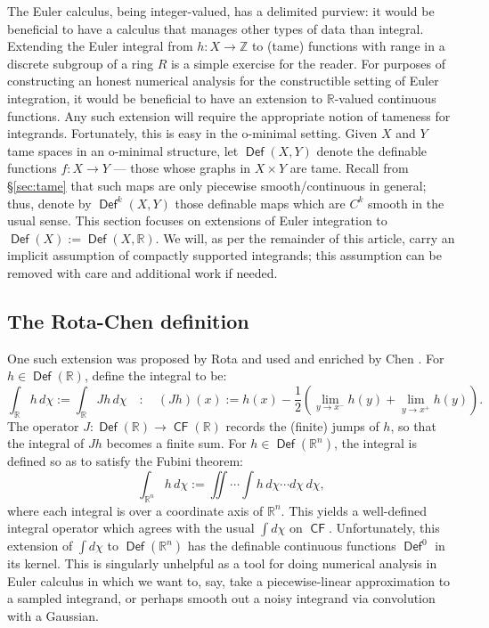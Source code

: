 \documentclass{psapm-l}
\theoremstyle{definition}
\theoremstyle{remark}
\numberwithin{equation}{section}
\begin{document}
The Euler calculus, being integer-valued, has a delimited purview: it would be beneficial to have a calculus that manages other types of data than integral. Extending the Euler integral from $h\colon X\to{{\mathbb Z}}$ to (tame) functions with range in a discrete subgroup of a ring $R$ is a simple exercise for the reader. For purposes of constructing an honest numerical analysis for the constructible setting of Euler integration, it would be beneficial to have an extension to ${{\mathbb R}}$-valued continuous functions. Any such extension will require the appropriate notion of tameness for integrands. Fortunately, this is easy in the o-minimal setting. Given $X$ and $Y$ tame spaces in an o-minimal structure, let ${{{\operatorname{\mathsf{{Def}}}}}}(X,Y)$ denote the definable functions $f\colon X\to Y$ --- those whose graphs in $X\times Y$ are tame. Recall from \S\ref{sec:tame} that such maps are only piecewise smooth/continuous in general; thus, denote by ${{{\operatorname{\mathsf{{Def}}}}}}^k(X,Y)$ those definable maps which are $C^k$ smooth in the usual sense. This section focuses on extensions of Euler integration to ${{{\operatorname{\mathsf{{Def}}}}}}(X):={{{\operatorname{\mathsf{{Def}}}}}}(X,{{\mathbb R}})$. We will, as per the remainder of this article, carry an implicit assumption of compactly supported integrands; this assumption can be removed with care and additional work if needed.

\subsection{The Rota-Chen definition}
\label{sec:RC}

One such extension was proposed by Rota \cite{Rota} and used and enriched by Chen \cite{Chen}. For $h\in{{{\operatorname{\mathsf{{Def}}}}}}({{\mathbb R}})$, define the integral to be:
\begin{equation}
    \int_{{\mathbb R}} h\,d\chi := \int_{{\mathbb R}} J h\,d\chi
    \quad : \quad
    (J h)(x) := h(x)-\frac{1}{2}\left(\lim_{y\to x^-}h(y)+\lim_{y\to x^+}h(y)\right) .
\end{equation}
The operator $J\colon{{{\operatorname{\mathsf{{Def}}}}}}({{\mathbb R}})\to{{{\operatorname{\mathsf{{CF}}}}}}({{\mathbb R}})$ records the (finite) jumps of $h$, so that the integral of $Jh$ becomes a finite sum. For $h\in{{{\operatorname{\mathsf{{Def}}}}}}({{\mathbb R}}^n)$, the integral is defined so as to satisfy the Fubini theorem:
\[
    \int_{{{\mathbb R}}^n} h\,d\chi := \iint\cdots\int h\,d\chi\cdots d\chi\,d\chi ,
\]
where each integral is over a coordinate axis of ${{\mathbb R}}^n$. This yields a well-defined integral operator which agrees with the usual $\int d\chi$ on ${{{\operatorname{\mathsf{{CF}}}}}}$. Unfortunately, this extension of $\int d\chi$ to ${{{\operatorname{\mathsf{{Def}}}}}}({{\mathbb R}}^n)$ has the definable continuous functions ${{{\operatorname{\mathsf{{Def}}}}}}^0$ in its kernel. This is singularly unhelpful as a tool for doing numerical analysis in Euler calculus in which we want to, say, take a piecewise-linear approximation to a sampled integrand, or perhaps smooth out a noisy integrand via convolution with a Gaussian.
\end{document}
